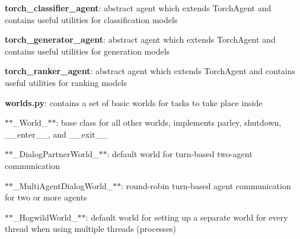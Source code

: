 \begin{DoxyItemize}
\item {\bfseries torch\+\_\+classifier\+\_\+agent}\+: abstract agent which extends Torch\+Agent and contains useful utilities for classification models
\item {\bfseries torch\+\_\+generator\+\_\+agent}\+: abstract agent which extends Torch\+Agent and contains useful utilities for generation models
\item {\bfseries torch\+\_\+ranker\+\_\+agent}\+: abstract agent which extends Torch\+Agent and contains useful utilities for ranking models
\item {\bfseries worlds.\+py}\+: contains a set of basic worlds for tasks to take place inside
\begin{DoxyItemize}
\item $\ast$$\ast$\+\_\+\+World\+\_\+$\ast$$\ast$\+: base class for all other worlds, implements {\ttfamily parley}, {\ttfamily shutdown}, {\ttfamily \+\_\+\+\_\+enter\+\_\+\+\_\+}, and {\ttfamily \+\_\+\+\_\+exit\+\_\+\+\_\+}
\item $\ast$$\ast$\+\_\+\+Dialog\+Partner\+World\+\_\+$\ast$$\ast$\+: default world for turn-\/based two-\/agent communication
\item $\ast$$\ast$\+\_\+\+Multi\+Agent\+Dialog\+World\+\_\+$\ast$$\ast$\+: round-\/robin turn-\/based agent communication for two or more agents
\item $\ast$$\ast$\+\_\+\+Hogwild\+World\+\_\+$\ast$$\ast$\+: default world for setting up a separate world for every thread when using multiple threads (processes) 
\end{DoxyItemize}
\end{DoxyItemize}